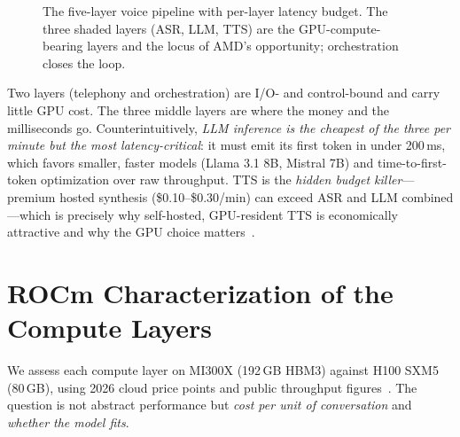 \documentclass[blind]{gtac}
\begin{document}
\begin{figure}[t]
\centering
{}
\caption{The five-layer voice pipeline with per-layer latency budget. The three shaded layers (ASR, LLM, TTS) are the GPU-compute-bearing layers and the locus of AMD's opportunity; orchestration closes the loop.}
\label{fig:pipe}
\end{figure}

Two layers (telephony and orchestration) are I/O- and control-bound and carry little GPU cost. The three middle layers are where the money and the milliseconds go. Counterintuitively, \emph{LLM inference is the cheapest of the three per minute but the most latency-critical}: it must emit its first token in under 200\,ms, which favors smaller, faster models (Llama 3.1 8B, Mistral 7B) and time-to-first-token optimization over raw throughput. TTS is the \emph{hidden budget killer}---premium hosted synthesis (\$0.10--\$0.30/min) can exceed ASR and LLM combined---which is precisely why self-hosted, GPU-resident TTS is economically attractive and why the GPU choice matters~\cite{bentoml_tts}.

\section{ROCm Characterization of the Compute Layers}
\label{sec:bench}
We assess each compute layer on MI300X (192\,GB HBM3) against H100 SXM5 (80\,GB), using 2026 cloud price points and public throughput figures~\cite{spheron_rocm,vllm_rocm,mlperf6}. The question is not abstract performance but \emph{cost per unit of conversation} and \emph{whether the model fits}.
\end{document}
